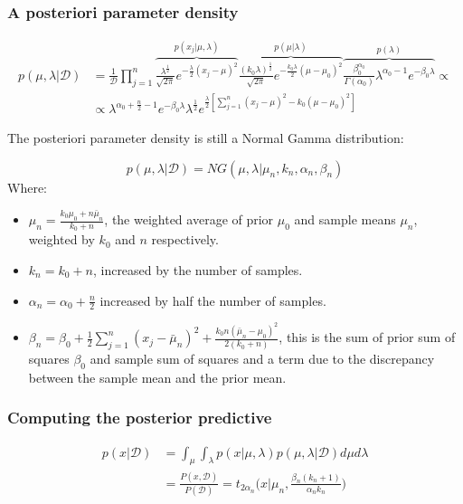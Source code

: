 		\subsubsection{A posteriori parameter density}

		\begin{align*}
			p(\mu, \lambda|\mathcal{D})& = \frac{1}{\mathcal{D}}\prod\limits_{j=1}^n\overbrace{\frac{\lambda^{\frac{1}{2}}}{\sqrt{2\pi}}e^{-\frac{\lambda}{2}(x_j-\mu)^2}}^{p(x_j|\mu, \lambda)}\overbrace{\frac{(k_0\lambda)^{\frac{1}{2}}}{\sqrt{2\pi}}e^{-\frac{k_0\lambda}{2}(\mu-\mu_0)^2}}^{p(\mu|\lambda)}\overbrace{\frac{\beta^{\alpha_0}_0}{\Gamma(\alpha_0)}\lambda^{\alpha_0-1}e^{-\beta_0\lambda}}^{p(\lambda)}\propto\\
									&\propto \lambda^{\alpha_0+\frac{n}{2}-1}e^{-\beta_0\lambda}\lambda^{\frac{1}{2}}e^{\frac{\lambda}{2}[\sum\limits_{j=1}^n(x_j-\mu)^2-k_0(\mu-\mu_0)^2]}
		\end{align*}

		The posteriori parameter density is still a Normal Gamma distribution:

		$$p(\mu, \lambda|\mathcal{D}) = NG(\mu, \lambda|\mu_n, k_n, \alpha_n, \beta_n)$$
		Where:

		\begin{itemize}
			\item $\mu_n = \frac{k_0\mu_0+n\bar{\mu}_n}{k_0+n}$, the weighted average of prior $\mu_0$ and sample means $\mu_n$, weighted by $k_0$ and $n$ respectively.
			\item $k_n = k_0+n$, increased by the number of samples.
			\item $\alpha_n = \alpha_0 + \frac{n}{2}$ increased by half the number of samples.
			\item $\beta_n = \beta_0+\frac{1}{2}\sum\limits_{j=1}^n(x_j-\bar{\mu}_n)^2+\frac{k_0n(\bar{\mu}_n-\mu_0)^2}{2(k_0+n)}$, this is the sum of prior sum of squares $\beta_0$ and sample sum of squares and a term due to the discrepancy between the sample mean and the prior mean.
		\end{itemize}

		\subsubsection{Computing the posterior predictive}

		\begin{align*}
			p(x|\mathcal{D}) &= \int_\mu\int_\lambda p(x|\mu, \lambda)p(\mu, \lambda|\mathcal{D})d\mu d\lambda\\
											&=\frac{P(x, \mathcal{D})}{P(\mathcal{D})} = t_{2\alpha_n}\biggl(x|\mu_n, \frac{\beta_n(k_n+1)}{\alpha_n k_n}\biggr)
		\end{align*}

